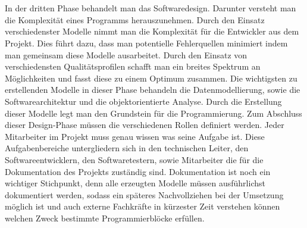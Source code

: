 \documentclass{llncs}
\begin{document}
\\ \\
In der dritten Phase behandelt man das Softwaredesign. Darunter versteht man die Komplexität eines Programms herauszunehmen. Durch den Einsatz verschiedenster Modelle nimmt man die Komplexität für die Entwickler aus dem Projekt. Dies führt dazu, dass man potentielle Fehlerquellen minimiert indem man gemeinsam diese Modelle ausarbeitet. Durch den Einsatz von verschiedensten Qualitätsprofilen schafft man ein breites Spektrum an Möglichkeiten und fasst diese zu einem Optimum zusammen. Die wichtigsten zu erstellenden Modelle in dieser Phase behandeln die Datenmodellierung, sowie die Softwarearchitektur und die objektorientierte Analyse. Durch die Erstellung dieser Modelle legt man den Grundstein für die Programmierung. Zum Abschluss dieser Design-Phase müssen die verschiedenen Rollen definiert werden. Jeder Mitarbeiter im Projekt muss genau wissen was seine Aufgabe ist. Diese Aufgabenbereiche untergliedern sich in den technischen Leiter, den Softwareentwicklern, den Softwaretestern, sowie Mitarbeiter die für die Dokumentation des Projekts zuständig sind. Dokumentation ist noch ein wichtiger Stichpunkt, denn alle erzeugten Modelle müssen ausführlichst dokumentiert werden, sodass ein späteres Nachvollziehen bei der Umsetzung möglich ist und auch externe Fachkräfte in kürzester Zeit verstehen können welchen Zweck bestimmte Programmierblöcke erfüllen.
\\ \\
\end{document}
